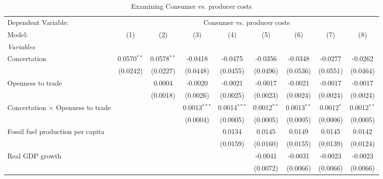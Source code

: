 
\begin{table}[htbp]
   \caption{Examining Consumer vs. producer costs}
   \centering
   \begin{tabular}{lcccccccc}
      \tabularnewline \midrule \midrule
      Dependent Variable: & \multicolumn{8}{c}{Consumer vs. producer costs}\\
      Model:                                   & (1)           & (2)           & (3)            & (4)            & (5)           & (6)           & (7)          & (8)\\  
      \midrule
      \emph{Variables}\\
      Concertation                             & 0.0570$^{**}$ & 0.0578$^{**}$ & -0.0418        & -0.0475        & -0.0356       & -0.0348       & -0.0277      & -0.0262\\   
                                               & (0.0242)      & (0.0227)      & (0.0448)       & (0.0455)       & (0.0496)      & (0.0536)      & (0.0551)     & (0.0464)\\   
      Openness to trade                        &               & 0.0004        & -0.0020        & -0.0021        & -0.0017       & -0.0021       & -0.0017      & -0.0017\\   
                                               &               & (0.0018)      & (0.0026)       & (0.0025)       & (0.0023)      & (0.0024)      & (0.0024)     & (0.0024)\\   
      Concertation $\times$ Openness to trade  &               &               & 0.0013$^{***}$ & 0.0014$^{***}$ & 0.0012$^{**}$ & 0.0013$^{**}$ & 0.0012$^{*}$ & 0.0012$^{**}$\\   
                                               &               &               & (0.0004)       & (0.0005)       & (0.0005)      & (0.0005)      & (0.0006)     & (0.0005)\\   
      Fossil fuel production per capita        &               &               &                & 0.0134         & 0.0145        & 0.0149        & 0.0145       & 0.0142\\   
                                               &               &               &                & (0.0159)       & (0.0160)      & (0.0155)      & (0.0139)     & (0.0124)\\   
      Real GDP growth                          &               &               &                &                & -0.0041       & -0.0031       & -0.0023      & -0.0023\\   
                                               &               &               &                &                & (0.0072)      & (0.0066)      & (0.0066)     & (0.0066)\\   

\end{tabular}
\end{table}
